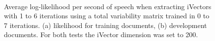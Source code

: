 \begin{figure}[hbt]
	\begin{center}
		\\
	\end{center}
	\caption{Average log-likelihood per second of speech when extracting iVectors with 1 to 6 iterations using a total variability matrix trained in 0 to 7 iterations. (a) likelihood for training documents, (b) development documents. For both tests the iVector dimension was set to 200.}
	\label{fig:vanextractlike}
\end{figure}

